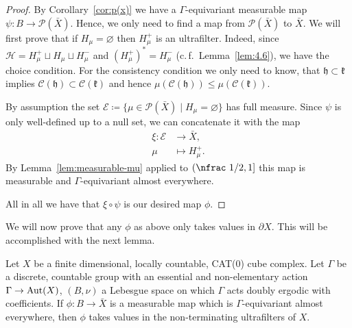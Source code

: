 \begin{proof}
  By Corollary~\ref{cor:p(x)} we have a \(\Gamma\)-equivariant measurable map \(\psi\colon B \to \mathcal{P}(\bar X)\). Hence, we only need to find a map from \(\mathcal{P}(\bar X)\) to \(\bar X\). We will first prove that if \(H_\mu = \varnothing\) then \(H_\mu^+\) is an ultrafilter. Indeed, since \(\mathcal{H} = H_\mu^+ \sqcup H_\mu \sqcup H_\mu^-\) and \((H_\mu^+)^\ast = H_\mu^-\) (c.\,f.~Lemma~\ref{lem:4.6}), we have the choice condition. For the consistency condition we only need to know, that \(\mathfrak{h} \subset \mathfrak{k}\) implies \(\mathcal{C}(\mathfrak{h}) \subset \mathcal{C}(\mathfrak{k})\) and hence \(\mu(\mathcal{C}(\mathfrak{h}))\leq \mu(\mathcal{C}(\mathfrak{k}))\).

  By assumption the set \(\mathcal{E} \coloneqq \{\mu \in \mathcal{P}(\bar X) \mid H_\mu = \varnothing\}\) has full measure. Since \(\psi\) is only well-defined up to a null set, we can concatenate it with the map
  \begin{align*}
    \xi\colon \mathcal{E} &\to \bar X,\\
    \mu &\mapsto H_\mu^+.
  \end{align*}
  By Lemma~\ref{lem:measurable-mu} applied to \({(\text{\nfrac 1/2}, 1]}\) this map is measurable and \(\Gamma\)-equivariant almost everywhere.

  All in all we have that \(\xi \circ \psi\) is our desired map \(\phi\).
\end{proof}

We will now prove that any \(\phi\) as above only takes values in \(\partial X\). This will be accomplished with the next lemma.

\begin{lemma}[{\cite[Lemma~4.11]{MR3509968}}]
  \label{lem:4.11}
  Let \(X\) be a finite dimensional, locally countable, CAT(0) cube complex. Let  \(\Gamma\) be a discrete, countable group with an essential and non-elementary action \(\Gamma \to \operatorname{Aut}(X)\), \((B, \nu)\) a Lebesgue space on which \(\Gamma\) acts doubly ergodic with coefficients. If \(\phi\colon B \to \bar X\) is a measurable map which is \(\Gamma\)-equivariant almost everywhere, then \(\phi\) takes values in the non-terminating ultrafilters of \(X\).
\end{lemma}

